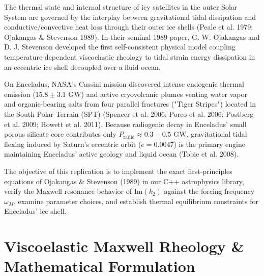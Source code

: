 \documentclass[11pt,a4paper]{article}
\begin{document}
The thermal state and internal structure of icy satellites in the outer Solar System are governed by the interplay between gravitational tidal dissipation and conductive/convective heat loss through their outer ice shells (Peale et al. 1979; Ojakangas \& Stevenson 1989). In their seminal 1989 paper, G. W. Ojakangas and D. J. Stevenson developed the first self-consistent physical model coupling temperature-dependent viscoelastic rheology to tidal strain energy dissipation in an eccentric ice shell decoupled over a fluid ocean.

On Enceladus, NASA's Cassini mission discovered intense endogenic thermal emission ($15.8 \pm 3.1\text{ GW}$) and active cryovolcanic plumes venting water vapor and organic-bearing salts from four parallel fractures ("Tiger Stripes") located in the South Polar Terrain (SPT) (Spencer et al. 2006; Porco et al. 2006; Postberg et al. 2009; Howett et al. 2011). Because radiogenic decay in Enceladus' small porous silicate core contributes only $P_{\text{radio}} \approx 0.3-0.5\text{ GW}$, gravitational tidal flexing induced by Saturn's eccentric orbit ($e = 0.0047$) is the primary engine maintaining Enceladus' active geology and liquid ocean (Tobie et al. 2008).

The objective of this replication is to implement the exact first-principles equations of Ojakangas \& Stevenson (1989) in our C++ astrophysics library, verify the Maxwell resonance behavior of $\text{Im}(k_2)$ against the forcing frequency $\omega_M$, examine parameter choices, and establish thermal equilibrium constraints for Enceladus' ice shell.

\section{Viscoelastic Maxwell Rheology \& Mathematical Formulation}
\end{document}
